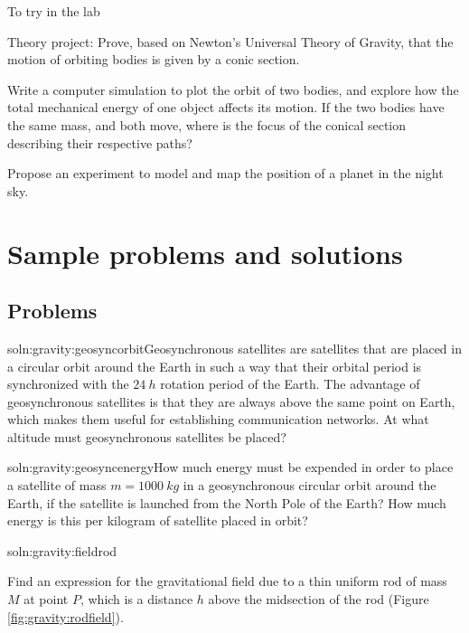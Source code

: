 \begin{chapteractivity}{To try in the lab}
{
\item Theory project: Prove, based on Newton's Universal Theory of Gravity, that the motion of orbiting bodies is given by a conic section. 
\item Write a computer simulation to plot the orbit of two bodies, and explore how the total mechanical energy of one object affects its motion. If the two bodies have the same mass, and both move, where is the focus of the conical section describing their respective paths?
\item Propose an experiment to model and map the position of a planet in the night sky.
}
\end{chapteractivity}
\newpage
\section{Sample problems and solutions}
\subsection{Problems}
\begin{problem}{soln:gravity:geosyncorbit}{\label{prob:gravity:geosyncorbit}Geosynchronous satellites are satellites that are placed in a circular orbit around the Earth in such a way that their orbital period is synchronized with the $\SI{24}{h}$ rotation period of the Earth. The advantage of geosynchronous satellites is that they are always above the same point on Earth, which makes them useful for establishing communication networks. At what altitude must geosynchronous satellites be placed?}
\end{problem}

\begin{problem}{soln:gravity:geosyncenergy}{\label{prob:gravity:geosyncenergy}How much energy must be expended in order to place a satellite of mass $m=\SI{1000}{kg}$ in a geosynchronous circular orbit around the Earth, if the satellite is launched from the North Pole of the Earth? How much energy is this per kilogram of satellite placed in orbit?}
\end{problem}

\begin{problem}{soln:gravity:fieldrod}{\label{prob:gravity:fieldrod}Find an expression for the gravitational field due to a thin uniform rod of mass $M$ at point $P$, which is a distance $h$ above the midsection of the rod (Figure \ref{fig:gravity:rodfield}).

}
\end{problem}

